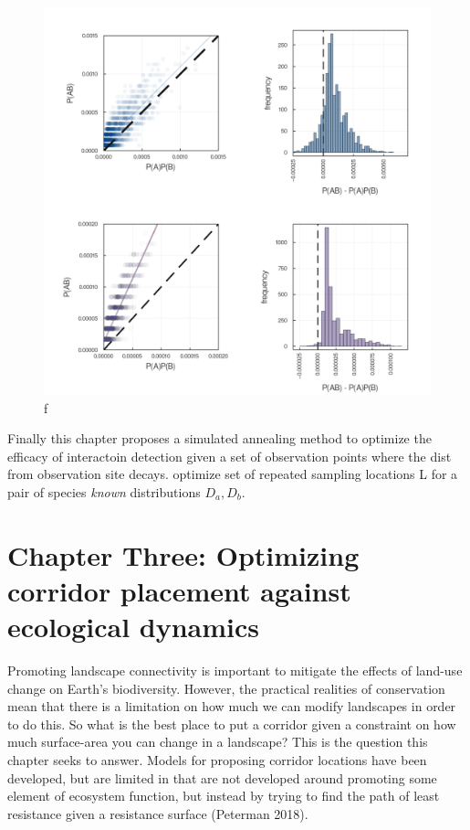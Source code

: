 \documentclass[11pt]{article}
\makeatletter
\def\maxwidth{\ifdim\Gin@nat@width>\linewidth\linewidth
\else\Gin@nat@width\fi}
\let\Oldincludegraphics\includegraphics
\renewcommand{\includegraphics}[1]{\Oldincludegraphics[width=\maxwidth]{#1}}
\makeatother
\begin{document}
\begin{figure}
\hypertarget{fig:posassoc}{%
\centering
\includegraphics{./figures/positiveassociations.png}
\caption{f}\label{fig:posassoc}
}
\end{figure}

Finally this chapter proposes a simulated annealing method to optimize
the efficacy of interactoin detection given a set of observation points
where the dist from observation site decays. optimize set of repeated
sampling locations L for a pair of species \emph{known} distributions
\(D_a, D_b\).

\hypertarget{chapter-three-optimizing-corridor-placement-against-ecological-dynamics}{%
\section{Chapter Three: Optimizing corridor placement against ecological
dynamics}\label{chapter-three-optimizing-corridor-placement-against-ecological-dynamics}}

Promoting landscape connectivity is important to mitigate the effects of
land-use change on Earth's biodiversity. However, the practical
realities of conservation mean that there is a limitation on how much we
can modify landscapes in order to do this. So what is the best place to
put a corridor given a constraint on how much surface-area you can
change in a landscape? This is the question this chapter seeks to
answer. Models for proposing corridor locations have been developed, but
are limited in that are not developed around promoting some element of
ecosystem function, but instead by trying to find the path of least
resistance given a resistance surface (Peterman 2018).
\end{document}
